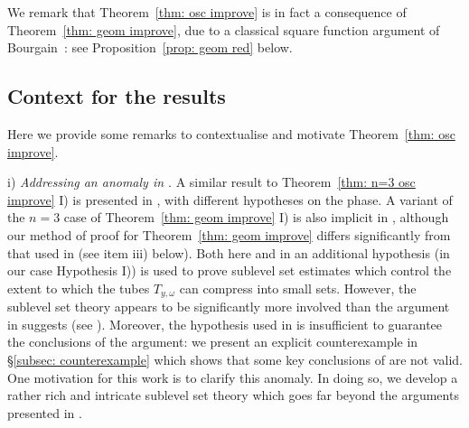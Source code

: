 \documentclass[reqno]{amsart}
\numberwithin{equation}{section}
\theoremstyle{plain}
\theoremstyle{definition}
\begin{document}
 We remark that Theorem~\ref{thm: osc improve} is in fact a consequence of Theorem~\ref{thm: geom improve}, due to a classical square function argument of Bourgain~\cite{Bourgain1991}: see Proposition~\ref{prop: geom red} below. 






\subsection{Context for the results}\label{subsec: context} Here we provide some remarks to contextualise and motivate Theorem~\ref{thm: osc improve}.\medskip

\noindent i) \textit{Addressing an anomaly in \cite{Bourgain1991}}. A similar result to Theorem~\ref{thm: n=3 osc improve} I) is presented in \cite[Theorem, p.366]{Bourgain1991}, with different hypotheses on the phase. A variant of the $n = 3$ case of Theorem~\ref{thm: geom improve} I) is also implicit in \cite{Bourgain1991}, although our method of proof for Theorem~\ref{thm: geom improve} differs significantly from that used in \cite{Bourgain1991} (see item iii) below). Both here and in \cite{Bourgain1991} an additional hypothesis (in our case Hypothesis I)) is used to prove sublevel set estimates which control the extent to which the tubes $T_{y,\omega}$ can compress into small sets. However, the sublevel set theory appears to be significantly more involved than the argument in \cite{Bourgain1991} suggests (see \cite[pp.364-365]{Bourgain1991}). Moreover, the hypothesis used in \cite{Bourgain1991} is insufficient to guarantee the conclusions of the argument: we present an explicit counterexample in \S\ref{subsec: counterexample} which shows that some key conclusions of \cite{Bourgain1991} are not valid. One motivation for this work is to clarify this anomaly. In doing so, we develop a rather rich and intricate sublevel set theory which goes far beyond the arguments presented in \cite{Bourgain1991}.\medskip
\end{document}
